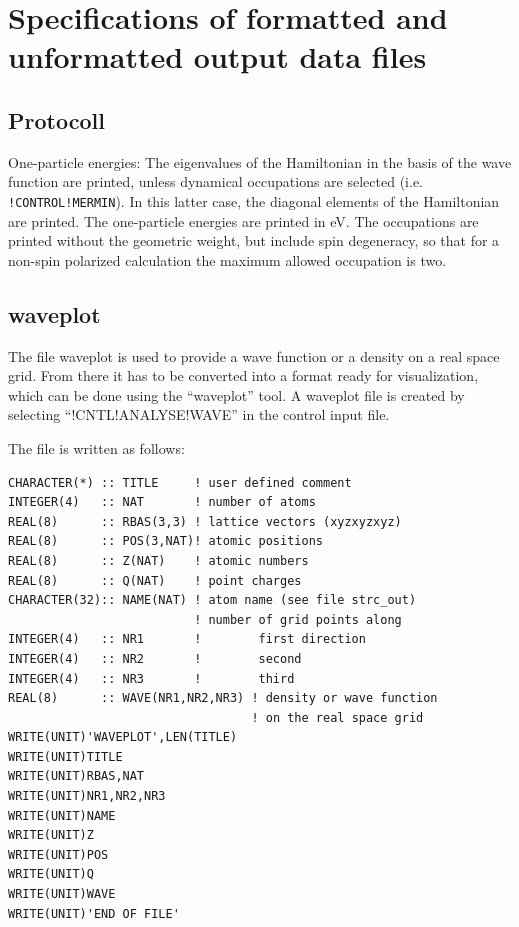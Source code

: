 \documentclass[final,12pt]{article}
\begin{document}
{{{%
\newpage
\section{Specifications of formatted and unformatted output data files}
\subsection{Protocoll}
One-particle energies: The eigenvalues of the Hamiltonian in the basis
of the wave function are printed, unless dynamical occupations are
selected (i.e. \texttt{!CONTROL!MERMIN}). In this latter case, the
diagonal elements of the Hamiltonian are printed. The one-particle
energies are printed in eV. The occupations are printed without the
geometric weight, but include spin degeneracy, so that for a non-spin
polarized calculation the maximum allowed occupation is two.



\subsection{waveplot}
The file waveplot is used to provide a wave function or a density on
a real space grid. From there it has to be converted into a format
ready for visualization, which can be done using the ``waveplot'' tool.
A waveplot file is created by selecting ``!CNTL!ANALYSE!WAVE'' in the
control input file.


The file is written as follows:
\small{
\begin{verbatim}
CHARACTER(*) :: TITLE     ! user defined comment
INTEGER(4)   :: NAT       ! number of atoms
REAL(8)      :: RBAS(3,3) ! lattice vectors (xyzxyzxyz)
REAL(8)      :: POS(3,NAT)! atomic positions
REAL(8)      :: Z(NAT)    ! atomic numbers 
REAL(8)      :: Q(NAT)    ! point charges
CHARACTER(32):: NAME(NAT) ! atom name (see file strc_out)
                          ! number of grid points along 
INTEGER(4)   :: NR1       !        first direction
INTEGER(4)   :: NR2       !        second
INTEGER(4)   :: NR3       !        third
REAL(8)      :: WAVE(NR1,NR2,NR3) ! density or wave function 
                                  ! on the real space grid
WRITE(UNIT)'WAVEPLOT',LEN(TITLE)
WRITE(UNIT)TITLE
WRITE(UNIT)RBAS,NAT
WRITE(UNIT)NR1,NR2,NR3
WRITE(UNIT)NAME
WRITE(UNIT)Z
WRITE(UNIT)POS
WRITE(UNIT)Q
WRITE(UNIT)WAVE
WRITE(UNIT)'END OF FILE'
\end{verbatim}
}

}}}
\end{document}
